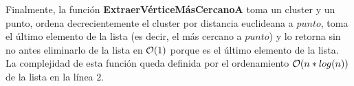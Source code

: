
Finalmente, la función \textbf{ExtraerVérticeMásCercanoA} toma un cluster y un punto, ordena decrecientemente el cluster por distancia euclideana a $punto$, toma el último elemento de la lista (es decir, el más cercano a $punto$) y lo retorna sin no antes eliminarlo de la lista en $\mathcal{O}(1)$ porque es el último elemento de la lista. La complejidad de esta función queda definida por el ordenamiento $\mathcal{O}(n*log(n))$ de la lista en la línea $2$.


